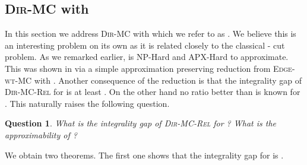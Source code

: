 \documentclass[11pt]{article}
\newtheorem{question}{Question}
\def\MC{\textsc{Edge-wt-MC}\xspace}
\def\DirMC{\textsc{Dir-MC}\xspace}
\def\2DirMC{\text{-Bi-Cut}\xspace}
\def\DirMCRel{\textsc{Dir-MC-Rel}\xspace}
\begin{document}
\iffalse
\paragraph{Running time analysis and derandomization:}
The randomized algorithm can be easily implemented. The main step is
to find  for each  once  is chosen.  We can
accomplish this by computing  for all 
and all . This takes  single-source shortest path
computations on a graph with  nodes and  edges.  Using the
-time implementation of Dijkstra's algorithm for
single-source shortest paths, we obtain a running time of  for the randomized algorithm.  However, we can, in fact
obtain a running time of  by taking advantage of the
analysis in Lemma~\ref{lem:prob-e-cut}. We observe that, to obtain, a
-approximation it suffices to compute for each node , only the
minimum and second minimum from .
This can be accomplished in time that is essentially two single-source
computations. We give details in the appendix.

The algorithm can be easily derandomized by computing  for
each  and outputting the cheapest cut among all of them.
There are only a finite number of distinct cuts that need to be considered.
Again, taking advantages of the analysis in  Lemma~\ref{lem:prob-e-cut},
we can find a -approximation is  time. Details in appendix.
\fi

\subsection{\DirMC with }
\label{sec:2-terminal-dir-mc}
In this section we address \DirMC with  which we refer to as
\2DirMC. We believe this is an interesting problem on its own as it is
related closely to the classical - cut problem.  As we remarked
earlier, \2DirMC is NP-Hard and APX-Hard to approximate. This was
shown in \cite{GargVY94,GargVY04} via a simple approximation preserving
reduction from \MC with .  Another consequence of the reduction
is that the integrality gap of \DirMCRel for \2DirMC is at least
. On the other hand no ratio better than  is known for
\2DirMC. This naturally raises the following question.

\begin{question}
  What is the integrality gap of \DirMCRel for \2DirMC? What is
  the approximability of \2DirMC?
\end{question}

We obtain two theorems. The first one shows that the integrality gap 
for \2DirMC is .
\end{document}
